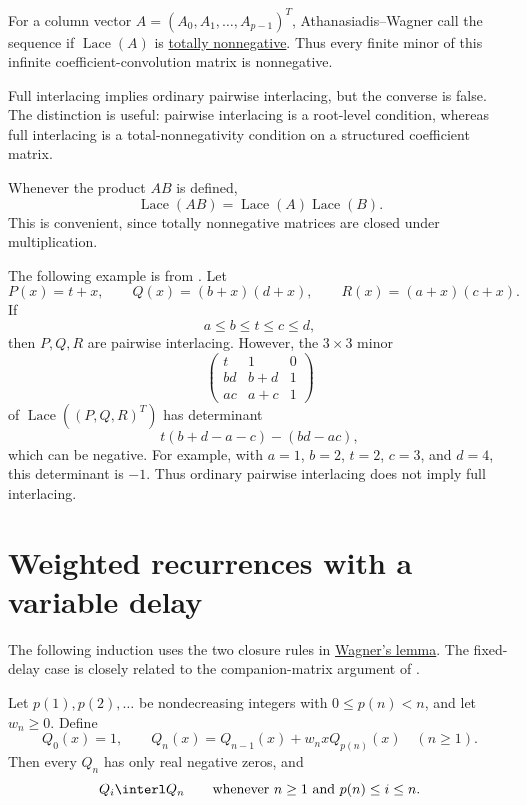 For a column vector $A=(A_0,A_1,\dotsc,A_{p-1})^T$, Athanasiadis--Wagner call
the sequence \label{fullyInterlacingSequence}
if $\operatorname{Lace}(A)$ is
\hyperref[totallyNonnegative]{totally nonnegative}.  Thus every finite minor
of this infinite coefficient-convolution matrix is nonnegative.

Full interlacing implies ordinary pairwise interlacing, but the converse is
false.  The distinction is useful: pairwise interlacing is a root-level
condition, whereas full interlacing is a total-nonnegativity condition on a
structured coefficient matrix.

Whenever the product $AB$ is defined,
\[
 \operatorname{Lace}(AB)=\operatorname{Lace}(A)\operatorname{Lace}(B).
\]
This is convenient, since totally nonnegative matrices are closed under
multiplication.

\begin{example*}
The following example is from \cite[Ex.~3.4]{AthanasiadisWagner2024x}.  Let
\[
 P(x)=t+x,\qquad Q(x)=(b+x)(d+x),\qquad R(x)=(a+x)(c+x).
\]
If
\[
 a \leq b \leq t \leq c \leq d,
\]
then $P,Q,R$ are pairwise interlacing.  However, the $3\times 3$ minor
\[
 \begin{pmatrix}
 t   & 1   & 0 \\
 bd  & b+d & 1 \\
 ac  & a+c & 1
 \end{pmatrix}
\]
of $\operatorname{Lace}((P,Q,R)^T)$ has determinant
\[
 t(b+d-a-c)-(bd-ac),
\]
which can be negative.  For example, with
$a=1$, $b=2$, $t=2$, $c=3$, and $d=4$, this determinant is $-1$.
Thus ordinary pairwise interlacing does not imply full interlacing.
\end{example*}


\section[interlacingDelayRecurrences]{Weighted recurrences with a variable delay}

The following induction uses the two closure rules in
\hyperref[wagnerLemma]{Wagner's lemma}.
The fixed-delay case is closely related to the companion-matrix argument
of  \cite[Ex.~16.10]{Fisk2006x}.

\begin{theorem}
\label{interlacingNondecreasingPredecessor}
Let $p(1),p(2),\dotsc$ be nondecreasing integers with $0\leq p(n)<n$,
and let $w_n\geq0$. Define
\[
 Q_0(x)=1,\qquad
 Q_n(x)=Q_{n-1}(x)+w_nxQ_{p(n)}(x)\quad(n\geq1).
\]
Then every $Q_n$ has only real negative zeros, and
\[
 Q_i\interl Q_n\qquad\text{whenever }n\geq1\text{ and }p(n)\leq i\leq n.
\]
\end{theorem}

